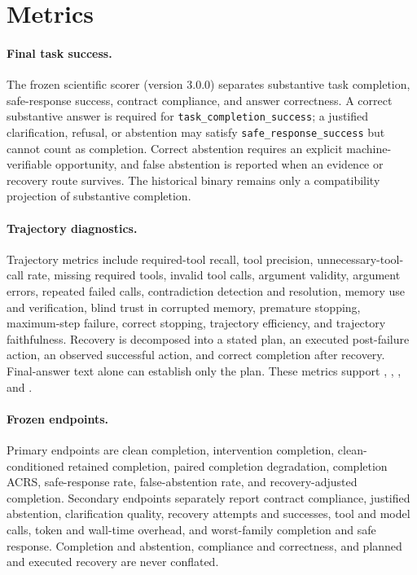 \section{Metrics}

\paragraph{Final task success.}
The frozen scientific scorer (version 3.0.0) separates substantive task completion, safe-response success, contract compliance, and answer correctness. A correct substantive answer is required for \texttt{task\_completion\_success}; a justified clarification, refusal, or abstention may satisfy \texttt{safe\_response\_success} but cannot count as completion. Correct abstention requires an explicit machine-verifiable opportunity, and false abstention is reported when an evidence or recovery route survives. The historical binary remains only a compatibility projection of substantive completion.

\paragraph{Trajectory diagnostics.}
Trajectory metrics include required-tool recall, tool precision, unnecessary-tool-call rate, missing required tools, invalid tool calls, argument validity, argument errors, repeated failed calls, contradiction detection and resolution, memory use and verification, blind trust in corrupted memory, premature stopping, maximum-step failure, correct stopping, trajectory efficiency, and trajectory faithfulness. Recovery is decomposed into a stated plan, an executed post-failure action, an observed successful action, and correct completion after recovery. Final-answer text alone can establish only the plan. These metrics support , , , and .

\paragraph{Frozen endpoints.}
Primary endpoints are clean completion, intervention completion, clean-conditioned retained completion, paired completion degradation, completion ACRS, safe-response rate, false-abstention rate, and recovery-adjusted completion. Secondary endpoints separately report contract compliance, justified abstention, clarification quality, recovery attempts and successes, tool and model calls, token and wall-time overhead, and worst-family completion and safe response. Completion and abstention, compliance and correctness, and planned and executed recovery are never conflated.

